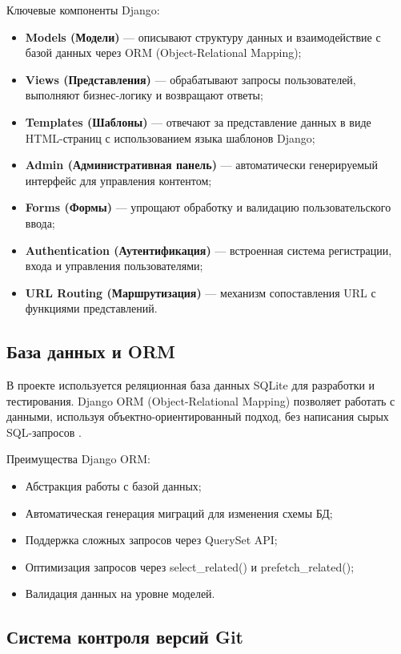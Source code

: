 \documentclass[pract,och,bachelor]{SCWorks}
\begin{document}
Ключевые компоненты Django:
\begin{itemize}
    \item \textbf{Models (Модели)} --- описывают структуру данных и взаимодействие с базой данных через ORM (Object-Relational Mapping);
    \item \textbf{Views (Представления)} --- обрабатывают запросы пользователей, выполняют бизнес-логику и возвращают ответы;
    \item \textbf{Templates (Шаблоны)} --- отвечают за представление данных в виде HTML-страниц с использованием языка шаблонов Django;
    \item \textbf{Admin (Административная панель)} --- автоматически генерируемый интерфейс для управления контентом;
    \item \textbf{Forms (Формы)} --- упрощают обработку и валидацию пользовательского ввода;
    \item \textbf{Authentication (Аутентификация)} --- встроенная система регистрации, входа и управления пользователями;
    \item \textbf{URL Routing (Маршрутизация)} --- механизм сопоставления URL с функциями представлений.
\end{itemize}

\subsection{База данных и ORM}

В проекте используется реляционная база данных SQLite для разработки и тестирования. Django ORM (Object-Relational Mapping) позволяет работать с данными, используя объектно-ориентированный подход, без написания сырых SQL-запросов \cite{django_orm}.

Преимущества Django ORM:
\begin{itemize}
    \item Абстракция работы с базой данных;
    \item Автоматическая генерация миграций для изменения схемы БД;
    \item Поддержка сложных запросов через QuerySet API;
    \item Оптимизация запросов через select\_related() и prefetch\_related();
    \item Валидация данных на уровне моделей.
\end{itemize}

\subsection{Система контроля версий Git}
\end{document}
